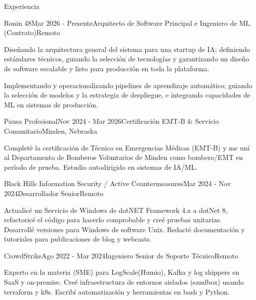 \documentclass{resume} %
\begin{document}

\begin{rSection}{Experiencia}

\begin{rSubsection}{Ronin 48}{Mar 2026 - Presente}{Arquitecto de Software Principal e Ingeniero de ML (Contrato)}{Remoto}
	\item Dise\~nando la arquitectura general del sistema para una startup de IA; definiendo est\'andares t\'ecnicos, guiando la selecci\'on de tecnolog\'ias y garantizando un dise\~no de software escalable y listo para producci\'on en toda la plataforma.
	\item Implementando y operacionalizando pipelines de aprendizaje autom\'atico; guiando la selecci\'on de modelos y la estrategia de despliegue, e integrando capacidades de ML en sistemas de producci\'on.
\end{rSubsection}

\begin{rSubsection}{Pausa Profesional}{Nov 2024 - Mar 2026}{Certificaci\'on EMT-B \& Servicio Comunitario}{Minden, Nebraska}
	\item Complet\'e la certificaci\'on de T\'ecnico en Emergencias M\'edicas (EMT-B) y me un\'i al Departamento de Bomberos Voluntarios de Minden como bombero/EMT en per\'iodo de prueba. Estudio autodirigido en sistemas de IA/ML.
\end{rSubsection}

\begin{rSubsection}{Black Hills Information Security / Active Countermeasures}{Mar 2024 - Nov 2024}{Desarrollador Senior}{Remoto}
	\item Actualic\'e un Servicio de Windows de dotNET Framework 4.x a dotNet 8, refactoric\'e el c\'odigo para hacerlo comprobable y cre\'e pruebas unitarias. Desarroll\'e versiones para Windows de software Unix. Redact\'e documentaci\'on y tutoriales para publicaciones de blog y webcasts.
\end{rSubsection}

\begin{rSubsection}{CrowdStrike}{Ago 2022 - Mar 2024}{Ingeniero Senior de Soporte T\'ecnico}{Remoto}
	\item Experto en la materia (SME) para LogScale(Humio), Kafka y log shippers en SaaS y on-premise. Cre\'e infraestructura de entornos aislados (sandbox) usando terraform y k8s. Escrib\'i automatizaci\'on y herramientas en bash y Python.
\end{rSubsection}


\end{rSection}
\end{document}
